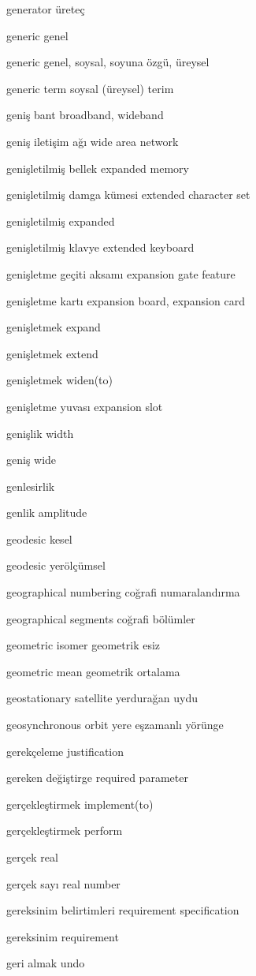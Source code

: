 \documentclass[12pt,fleqn]{article}\usepackage{../../common}
\begin{document}
generator üreteç

generic genel

generic genel, soysal, soyuna özgü, üreysel

generic term soysal (üreysel) terim

geniş bant broadband, wideband

geniş iletişim ağı wide area network

genişletilmiş bellek expanded memory

genişletilmiş damga kümesi extended character set

genişletilmiş expanded

genişletilmiş klavye extended keyboard

genişletme geçiti aksamı expansion gate feature

genişletme kartı expansion board, expansion card

genişletmek expand

genişletmek extend

genişletmek widen(to)

genişletme yuvası expansion slot

genişlik width

geniş wide

genlesirlik

genlik amplitude

geodesic kesel

geodesic yerölçümsel

geographical numbering coğrafi numaralandırma

geographical segments coğrafi bölümler

geometric isomer geometrik esiz

geometric mean geometrik ortalama

geostationary satellite yerdurağan uydu

geosynchronous orbit yere eşzamanlı yörünge

gerekçeleme justification

gereken değiştirge required parameter

gerçekleştirmek implement(to)

gerçekleştirmek perform

gerçek real

gerçek sayı real number

gereksinim belirtimleri requirement specification

gereksinim requirement

geri almak undo
\end{document}
